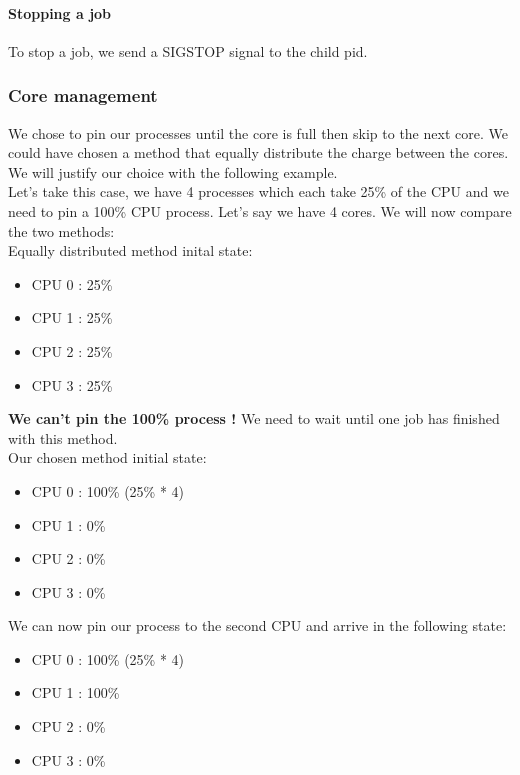 \documentclass[a4paper,11pt]{article}
\begin{document}
\paragraph{Stopping a job}
To stop a job, we send a SIGSTOP signal to the child pid.

\subsubsection{Core management}

We chose to pin our processes until the core is full then skip to the next core. We could have chosen a method that
equally distribute the charge between the cores.
We will justify our choice with the following example.\\

Let's take this case, we have 4 processes which each take 25\% of the CPU and we need to pin a
100\% CPU process. Let's say we have 4 cores. We will now compare the two methods:\\

Equally distributed method inital state:
\begin{itemize}
\item CPU 0 : 25\%
\item CPU 1 : 25\%
\item CPU 2 : 25\%
\item CPU 3 : 25\%
\end{itemize}

\textbf{We can't pin the 100\% process !} We need to wait until one job has finished with this method.\\

Our chosen method initial state:
\begin{itemize}
\item CPU 0 : 100\% (25\% * 4)
\item CPU 1 : 0\%
\item CPU 2 : 0\%
\item CPU 3 : 0\%
\end{itemize}

We can now pin our process to the second CPU and arrive in the following state:
\begin{itemize}
\item CPU 0 : 100\% (25\% * 4)
\item CPU 1 : 100\%
\item CPU 2 : 0\%
\item CPU 3 : 0\%
\end{itemize}
\end{document}
